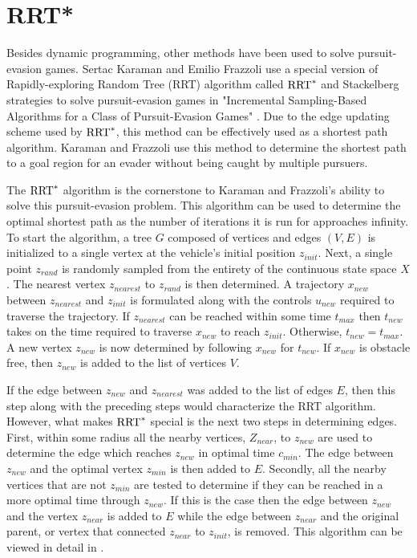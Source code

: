 \section{RRT*}
Besides dynamic programming, other methods have been used to solve pursuit-evasion games. Sertac Karaman and Emilio Frazzoli use a special version of Rapidly-exploring Random Tree (RRT) algorithm called $\textnormal{RRT}^*$ and Stackelberg strategies to solve pursuit-evasion games in "Incremental Sampling-Based Algorithms for a Class of Pursuit-Evasion Games" \cite{karaman}. Due to the edge updating scheme used by $\textnormal{RRT}^*$, this method can be effectively used as a shortest path algorithm. Karaman and Frazzoli use this method to determine the shortest path to a goal region for an evader without being caught by multiple pursuers.

The $\textnormal{RRT}^*$ algorithm is the cornerstone to Karaman and Frazzoli's ability to solve this pursuit-evasion problem. This algorithm can be used to determine the optimal shortest path as the number of iterations it is run for approaches infinity. To start the algorithm, a tree $G$ composed of vertices and edges $(V,E)$ is initialized to a single vertex at the vehicle's initial position $z_{init}$. Next, a single point $z_{rand}$ is randomly sampled from the entirety of the continuous state space $X$. The nearest vertex $z_{nearest}$ to $z_{rand}$ is then determined. A trajectory $x_{new}$ between $z_{nearest}$ and $z_{init}$ is formulated along with the controls $u_{new}$ required to traverse the trajectory. If $z_{nearest}$ can be reached within some time $t_{max}$ then $t_{new}$ takes on the time required to traverse $x_{new}$ to reach $z_{init}$. Otherwise, $t_{new} = t_{max}$. A new vertex $z_{new}$ is now determined by following $x_{new}$ for $t_{new}$. If $x_{new}$ is obstacle free, then $z_{new}$ is added to the list of vertices $V$. 

If the edge between $z_{new}$ and $z_{nearest}$ was added to the list of edges $E$, then this step along with the preceding steps would characterize the RRT algorithm. However, what makes $\textnormal{RRT}^*$ special is the next two steps in determining edges. First, within some radius all the nearby vertices, $Z_{near}$, to $z_{new}$ are used to determine the edge which reaches $z_{new}$ in optimal time $c_{min}$. The edge between $z_{new}$ and the optimal vertex $z_{min}$ is then added to $E$. Secondly, all the nearby vertices that are not $z_{min}$ are tested to determine if they can be reached in a more optimal time through $z_{new}$. If this is the case then the edge between $z_{new}$ and the vertex $z_{near}$ is added to $E$ while the edge between $z_{near}$ and the original parent, or vertex that connected $z_{near}$ to $z_{init}$, is removed. This algorithm can be viewed in detail in  \cite{karaman}. 
  
